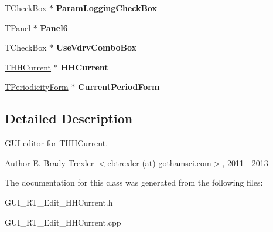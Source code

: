 \begin{DoxyCompactItemize}
\item 
\hypertarget{class_t_h_h_current_form_ad04fb7167ed1511fc086374125492ff9}{T\+Check\+Box $\ast$ {\bfseries Param\+Logging\+Check\+Box}}\label{class_t_h_h_current_form_ad04fb7167ed1511fc086374125492ff9}

\item 
\hypertarget{class_t_h_h_current_form_a87de73b8f08a686e0b18be094ebac998}{T\+Panel $\ast$ {\bfseries Panel6}}\label{class_t_h_h_current_form_a87de73b8f08a686e0b18be094ebac998}

\item 
\hypertarget{class_t_h_h_current_form_a17a84cf0c50393eb2d4cc4b3438c8e67}{T\+Check\+Box $\ast$ {\bfseries Use\+Vdrv\+Combo\+Box}}\label{class_t_h_h_current_form_a17a84cf0c50393eb2d4cc4b3438c8e67}

\item 
\hypertarget{class_t_h_h_current_form_a06eda24da690235897f1c8d933b82d8d}{\hyperlink{class_t_h_h_current}{T\+H\+H\+Current} $\ast$ {\bfseries H\+H\+Current}}\label{class_t_h_h_current_form_a06eda24da690235897f1c8d933b82d8d}

\item 
\hypertarget{class_t_h_h_current_form_a39b4101723007a93a5fc6ccae510eab2}{\hyperlink{class_t_periodicity_form}{T\+Periodicity\+Form} $\ast$ {\bfseries Current\+Period\+Form}}\label{class_t_h_h_current_form_a39b4101723007a93a5fc6ccae510eab2}

\end{DoxyCompactItemize}


\subsection{Detailed Description}
G\+U\+I editor for \hyperlink{class_t_h_h_current}{T\+H\+H\+Current}. 

\begin{DoxyAuthor}{Author}
E. Brady Trexler $<$ebtrexler (at) gothamsci.\+com$>$, 2011 -\/ 2013 
\end{DoxyAuthor}


The documentation for this class was generated from the following files\+:\begin{DoxyCompactItemize}
\item 
G\+U\+I\+\_\+\+R\+T\+\_\+\+Edit\+\_\+\+H\+H\+Current.\+h\item 
G\+U\+I\+\_\+\+R\+T\+\_\+\+Edit\+\_\+\+H\+H\+Current.\+cpp\end{DoxyCompactItemize}
